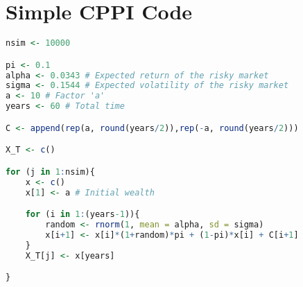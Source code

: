 \section{Simple CPPI Code}\label{ap:cppi-simple}


\begin{lstlisting}[language = R]
nsim <- 10000

pi <- 0.1
alpha <- 0.0343 # Expected return of the risky market
sigma <- 0.1544 # Expected volatility of the risky market
a <- 10 # Factor 'a'
years <- 60 # Total time

C <- append(rep(a, round(years/2)),rep(-a, round(years/2)))

X_T <- c()

for (j in 1:nsim){
	x <- c()
	x[1] <- a # Initial wealth

	for (i in 1:(years-1)){
		random <- rnorm(1, mean = alpha, sd = sigma)
		x[i+1] <- x[i]*(1+random)*pi + (1-pi)*x[i] + C[i+1]
	}
	X_T[j] <- x[years]

}
\end{lstlisting}

